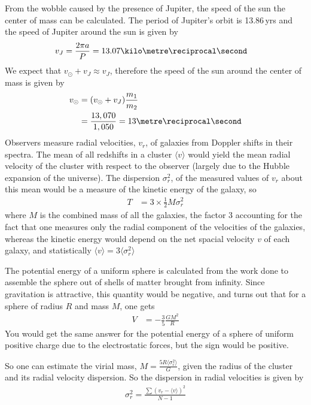 \documentclass[british]{article}
\begin{document}
From the wobble caused by the presence of Jupiter, the speed of the sun the center of mass can be calculated. The period of Jupiter's orbit is 13.86\,yrs and the speed of Jupiter around the sun is given by
\begin{align*}
	v_J &= \frac{2\pi a}{P} = \unit{13.07}{\kilo\metre\reciprocal\second}
\end{align*}
We expect that $v_{\odot}+v_J\approx v_J$, therefore the speed of the sun around the center of mass is given by
\begin{align*}
	v_{\odot} &= (v_{\odot}+v_J)\frac{m_1}{m_2} \\
	&= \frac{13,070}{1,050} = 13\metre\reciprocal\second
\end{align*}
Observers measure radial velocities, $v_r$, of galaxies from Doppler shifts in their spectra. The mean of all redshifts in a cluster $\langle v \rangle$ would yield the mean radial velocity of the cluster with respect to the observer (largely due to the Hubble expansion of the universe). The dispersion $\sigma_r^2$, of the measured values of $v_r$ about this mean would be a measure of the kinetic energy of the galaxy, so 
\begin{align*}
	T &= 3\times \frac{1}{2}M\sigma_r^2
\end{align*}
where $M$ is the combined mass of all the galaxies, the factor 3 accounting for the fact that one measures only the radial component of the velocities of the galaxies, whereas the kinetic energy would depend on the net spacial velocity $v$ of each galaxy, and statistically $\langle v\rangle = 3\langle \sigma_r^2\rangle$  

The potential energy of a uniform sphere is calculated from the work done to assemble the sphere out of shells of matter brought from infinity. Since gravitation is attractive, this quantity would be negative, and turns out that for a sphere of radius $R$ and mass $M$, one gets 
\begin{align*}
	V &= -\frac{3}{5}\frac{GM^2}{R}
\end{align*} 
You would get the same answer for the potential energy of a sphere of uniform positive charge due to the electrostatic forces, but the sign would be positive.

So one can estimate the virial mass, $M=\frac{5R\langle \sigma_r^2\rangle}{G}$, given the radius of the cluster and its radial velocity dispersion. So the dispersion in radial velocities is given by
\begin{align*}
	\sigma_r^2 = \frac{\sum (v_r - \langle v\rangle)^2 }{N-1}
\end{align*} 
\end{document}
